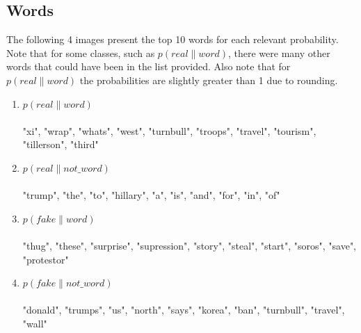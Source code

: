 \documentclass{article}
\begin{document}
   \subsection{Words}
   The following 4 images present the top 10 words for each relevant probability. Note that for some classes,
   such as $p(real \| word)$, there were many other words that could have been in the list provided. Also note
   that for $ p(real \| word)$ the probabilities are slightly greater than 1 due to rounding.
   \begin{enumerate}
   \item $p(real \| word)$
   \\

	\\
	"xi", "wrap", "whats", "west", "turnbull", "troops", "travel", "tourism", "tillerson", "third"

   \item $p(real \| not\_word)$
   \\
\\
	"trump", "the", "to", "hillary", "a", "is", "and", "for", "in", "of"


   \item $p(fake \| word)$
   \\
\\
	"thug", "these", "surprise", "supression", "story", "steal", "start", "soros", "save", "protestor"


   \item $p(fake \| not\_word)$
   \\
\\
	"donald", "trumps", "us", "north", "says", "korea", "ban", "turnbull", "travel", "wall"



   \end{enumerate}
\end{document}
